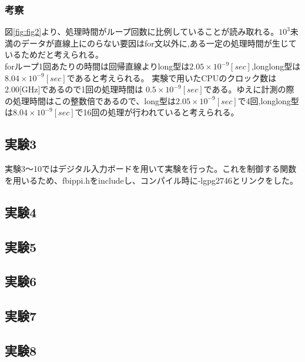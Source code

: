 \documentclass{jarticle}
\begin{document}
\subsubsection{考察}
図\ref{fig:fig2}より、処理時間がループ回数に比例していることが読み取れる。$10^3$未満のデータが直線上にのらない要因はfor文以外に,ある一定の処理時間が生じているためだと考えられる。\\
forループ1回あたりの時間は回帰直線よりlong型は$2.05 \times 10^{-9}[sec]$,longlong型は$8.04 \times 10^{-9}[sec]$であると考えられる。
実験で用いたCPUのクロック数は2.00[GHz]であるので1回の処理時間は
$0.5 \times 10^{-9}[sec]$である。ゆえに計測の際の処理時間はこの整数倍であるので、long型は$2.05 \times 10^{-9}[sec]$で4回,longlong型は$8.04 \times 10^{-9}[sec]$で16回の処理が行われていると考えられる。


\subsection{実験3}
実験3〜10ではデジタル入力ボードを用いて実験を行った。これを制御する関数を用いるため、fbippi.hをincludeし、コンパイル時に-lgpg2746とリンクをした。



\subsection{実験4}



\subsection{実験5}



\subsection{実験6}



\subsection{実験7}



\subsection{実験8}
\end{document}
